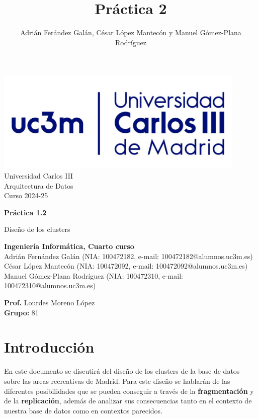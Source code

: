 \documentclass[]{article}
\title{Práctica 2}
\author{Adrián Ferández Galán, César López Mantecón y Manuel Gómez-Plana Rodríguez}
\begin{document}
\begin{titlepage}
    \centering
   \includegraphics[width=0.9\textwidth]{uc3m.jpg} 
    {\Huge Universidad Carlos III\\
    
     \Large Arquitectura de Datos\\
     \vspace{0.5cm}
     Curso 2024-25}
    \vspace{2cm}

    {\Huge \textbf{Práctica 1.2} \par}
    \vspace{0.5cm}
    {\Large Diseño de los clusters \par}
    \vspace{8cm}

   \textbf{Ingeniería Informática, Cuarto curso}\\
    \vspace{0.2cm} 
    Adrián Fernández Galán       (NIA: 100472182, e-mail: 100472182@alumnos.uc3m.es)\\
    César López Mantecón         (NIA: 100472092, e-mail: 100472092@alumnos.uc3m.es)\\
    Manuel Gómez-Plana Rodríguez (NIA: 100472310, e-mail: 100472310@alumnos.uc3m.es)
    \vspace{0.5cm}

   
    \textbf{Prof.} Lourdes Moreno López\\
    
    \textbf{Grupo: } 81   
    
\end{titlepage}
\newpage

\renewcommand{\contentsname}{\centering Índice}
\tableofcontents

\newpage
\section{Introducción}
\label{sec:introduccion}
En este documento se discutirá del diseño de los clusters de la base de datos sobre las areas recreativas de Madrid. Para este diseño se hablarán de las diferentes posibilidades que se pueden conseguir a través de la \textbf{fragmentación} y de la \textbf{replicación}, además de analizar sus consecuencias tanto en el contexto de nuestra base de datos como en contextos parecidos.
\newpage
\lstset{style=python}
\end{document}
